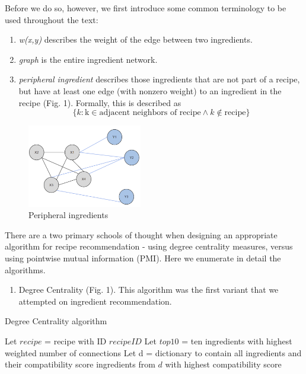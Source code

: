 \documentclass{acm_proc_article-sp}
\begin{document}
Before we do so, however, we first introduce some common terminology to be used throughout the text:
\begin{enumerate}
	\item \textit{w(x,y)} describes the weight of the edge between two ingredients.
	\item \textit{graph} is the entire ingredient network.
	\item \textit{peripheral ingredient} describes those ingredients that are not part of a recipe, but have at least one edge (with nonzero weight) to an ingredient in the recipe (Fig. 1). Formally, this is described as
	\[\{k : \text{k} \in \text{adjacent neighbors of recipe} \wedge k \notin \text{recipe}\}
	\]
\end{enumerate}


\begin{figure}
	\centering
	\includegraphics[width=5cm]{peripheral}
	\caption{Peripheral ingredients}
\end{figure}



There are a two primary schools of thought when designing an appropriate algorithm for recipe recommendation - using degree centrality measures, versus using pointwise mutual information (PMI). Here we enumerate in detail the algorithms.

\begin{enumerate}
	\item Degree Centrality (Fig. 1). This algorithm was the first variant that we attempted on ingredient recommendation. 


\end{enumerate}

  \begin{algorithm}
   \caption{Degree Centrality algorithm}
    \begin{algorithmic}[1]
      	\State Let $recipe$ = recipe with ID $recipeID$
        \State Let $top10$ = ten ingredients with highest weighted number of connections
        \State Let d = dictionary to contain all ingredients and their compatibility score
        		\EndFor
        	\EndIf
        \EndFor
         ingredients from $d$ with highest compatibility score
       \EndFunction

\end{algorithmic}
\end{algorithm}
\end{document}
